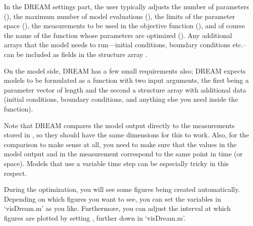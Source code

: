 
In the DREAM settings part, the user typically adjusts the number of parameters (), the maximum number of model evaluations (), the limits of the parameter space (), the measurements to be used in the objective function (), and of course the name of the function whose parameters are optimized (). Any additional arrays that the model needs to run---initial conditions, boundary conditions etc.--can be included as fields in the structure array . 


On the model side, DREAM has a few small requirements also; DREAM expects models to be formulated as a function with two input arguments, the first being a parameter vector of length  and the second a structure array with additional data (initial conditions, boundary conditions, and anything else you need inside the function).


Note that DREAM compares the model output directly to the measurements stored in , so they should have the same dimensions for this to work. Also, for the comparison to make sense at all, you need to make sure that the values in the model output and in the measurement correspond to the same point in time (or space). Models that use a variable time step can be especially tricky in this respect.


During the optimization, you will see some figures being created automatically. Depending on which figures you want to see, you can set the  variables in `visDream.m' as you like. Furthermore, you can adjust the interval at which figures are plotted by setting , further down in `visDream.m'.



